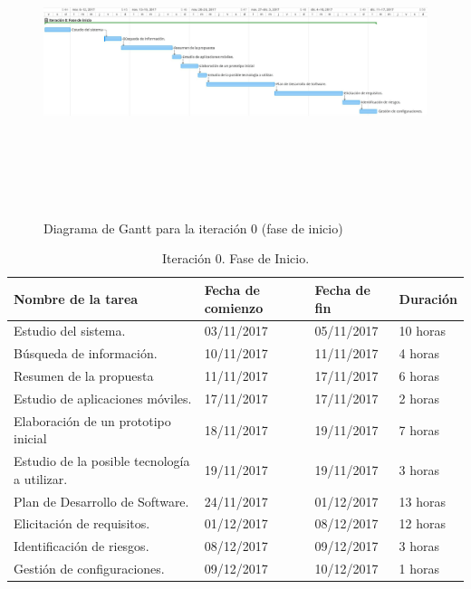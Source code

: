 \documentclass[twoside]{report}
\begin{document}
\begin{figure}[h]
\begin{center}
\includegraphics[height=9cm, width=\textwidth]{images/gantt/ite0}
\caption{Diagrama de Gantt para la iteración 0 (fase de inicio)}
\end{center}
\end{figure}

\begin{table}[H]
\centering
	\begin{tabular}{|l|l|l|l|}
    \hline
    Nombre de la tarea                           & Fecha de comienzo & Fecha de fin & Duración \\ \hline
    Estudio del sistema.                         & 03/11/2017        & 05/11/2017   & 10 horas  \\ \hline
    Búsqueda de información.                     & 10/11/2017        & 11/11/2017   & 4 horas   \\ \hline
    Resumen de la propuesta                      & 11/11/2017        & 17/11/2017   & 6 horas   \\ \hline
    Estudio de aplicaciones móviles.             & 17/11/2017        & 17/11/2017   & 2 horas   \\ \hline
    Elaboración de un prototipo inicial          & 18/11/2017        & 19/11/2017   & 7 horas   \\ \hline
    Estudio de la posible tecnología a utilizar. & 19/11/2017        & 19/11/2017   & 3 horas   \\ \hline
    Plan de Desarrollo de Software.              & 24/11/2017        & 01/12/2017   & 13 horas   \\ \hline
    Elicitación de requisitos.                   & 01/12/2017        & 08/12/2017   & 12 horas   \\ \hline
    Identificación de riesgos.                   & 08/12/2017        & 09/12/2017   & 3 horas   \\ \hline
    Gestión de configuraciones.                  & 09/12/2017        & 10/12/2017   & 1 horas   \\ \hline
    \end{tabular}
    \caption{Iteración 0. Fase de Inicio.}
\end{table}
\end{document}

